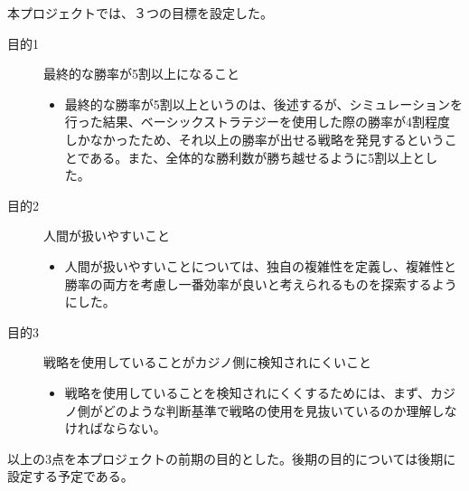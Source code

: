 本プロジェクトでは、３つの目標を設定した。
\begin{description}
\item[目的1] 最終的な勝率が5割以上になること
\begin{itemize}
\item{最終的な勝率が5割以上というのは、後述するが、シミュレーションを行った結果、ベーシックストラテジーを使用した際の勝率が4割程度しかなかったため、それ以上の勝率が出せる戦略を発見するということである。また、全体的な勝利数が勝ち越せるように5割以上とした。}
\end{itemize}
\item[目的2]人間が扱いやすいこと
\begin{itemize}
\item{人間が扱いやすいことについては、独自の複雑性を定義し、複雑性と勝率の両方を考慮し一番効率が良いと考えられるものを探索するようにした。}
\end{itemize}
\item[目的3]戦略を使用していることがカジノ側に検知されにくいこと
\begin{itemize}
\item{戦略を使用していることを検知されにくくするためには、まず、カジノ側がどのような判断基準で戦略の使用を見抜いているのか理解しなければならない。}
\end{itemize}
\end{description}
以上の3点を本プロジェクトの前期の目的とした。後期の目的については後期に設定する予定である。
